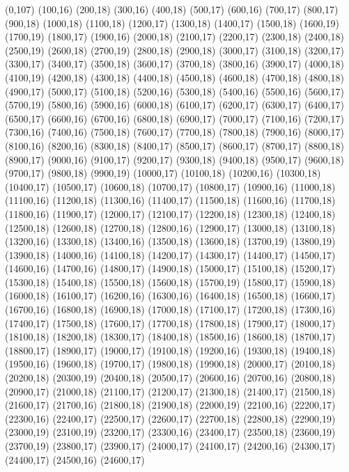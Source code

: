 (0,107)
(100,16)
(200,18)
(300,16)
(400,18)
(500,17)
(600,16)
(700,17)
(800,17)
(900,18)
(1000,18)
(1100,18)
(1200,17)
(1300,18)
(1400,17)
(1500,18)
(1600,19)
(1700,19)
(1800,17)
(1900,16)
(2000,18)
(2100,17)
(2200,17)
(2300,18)
(2400,18)
(2500,19)
(2600,18)
(2700,19)
(2800,18)
(2900,18)
(3000,17)
(3100,18)
(3200,17)
(3300,17)
(3400,17)
(3500,18)
(3600,17)
(3700,18)
(3800,16)
(3900,17)
(4000,18)
(4100,19)
(4200,18)
(4300,18)
(4400,18)
(4500,18)
(4600,18)
(4700,18)
(4800,18)
(4900,17)
(5000,17)
(5100,18)
(5200,16)
(5300,18)
(5400,16)
(5500,16)
(5600,17)
(5700,19)
(5800,16)
(5900,16)
(6000,18)
(6100,17)
(6200,17)
(6300,17)
(6400,17)
(6500,17)
(6600,16)
(6700,16)
(6800,18)
(6900,17)
(7000,17)
(7100,16)
(7200,17)
(7300,16)
(7400,16)
(7500,18)
(7600,17)
(7700,18)
(7800,18)
(7900,16)
(8000,17)
(8100,16)
(8200,16)
(8300,18)
(8400,17)
(8500,17)
(8600,17)
(8700,17)
(8800,18)
(8900,17)
(9000,16)
(9100,17)
(9200,17)
(9300,18)
(9400,18)
(9500,17)
(9600,18)
(9700,17)
(9800,18)
(9900,19)
(10000,17)
(10100,18)
(10200,16)
(10300,18)
(10400,17)
(10500,17)
(10600,18)
(10700,17)
(10800,17)
(10900,16)
(11000,18)
(11100,16)
(11200,18)
(11300,16)
(11400,17)
(11500,18)
(11600,16)
(11700,18)
(11800,16)
(11900,17)
(12000,17)
(12100,17)
(12200,18)
(12300,18)
(12400,18)
(12500,18)
(12600,18)
(12700,18)
(12800,16)
(12900,17)
(13000,18)
(13100,18)
(13200,16)
(13300,18)
(13400,16)
(13500,18)
(13600,18)
(13700,19)
(13800,19)
(13900,18)
(14000,16)
(14100,18)
(14200,17)
(14300,17)
(14400,17)
(14500,17)
(14600,16)
(14700,16)
(14800,17)
(14900,18)
(15000,17)
(15100,18)
(15200,17)
(15300,18)
(15400,18)
(15500,18)
(15600,18)
(15700,19)
(15800,17)
(15900,18)
(16000,18)
(16100,17)
(16200,16)
(16300,16)
(16400,18)
(16500,18)
(16600,17)
(16700,16)
(16800,18)
(16900,18)
(17000,18)
(17100,17)
(17200,18)
(17300,16)
(17400,17)
(17500,18)
(17600,17)
(17700,18)
(17800,18)
(17900,17)
(18000,17)
(18100,18)
(18200,18)
(18300,17)
(18400,18)
(18500,16)
(18600,18)
(18700,17)
(18800,17)
(18900,17)
(19000,17)
(19100,18)
(19200,16)
(19300,18)
(19400,18)
(19500,16)
(19600,18)
(19700,17)
(19800,18)
(19900,18)
(20000,17)
(20100,18)
(20200,18)
(20300,19)
(20400,18)
(20500,17)
(20600,16)
(20700,16)
(20800,18)
(20900,17)
(21000,18)
(21100,17)
(21200,17)
(21300,18)
(21400,17)
(21500,18)
(21600,17)
(21700,16)
(21800,18)
(21900,18)
(22000,19)
(22100,16)
(22200,17)
(22300,16)
(22400,17)
(22500,17)
(22600,17)
(22700,18)
(22800,18)
(22900,19)
(23000,19)
(23100,19)
(23200,17)
(23300,16)
(23400,17)
(23500,18)
(23600,19)
(23700,19)
(23800,17)
(23900,17)
(24000,17)
(24100,17)
(24200,16)
(24300,17)
(24400,17)
(24500,16)
(24600,17)

